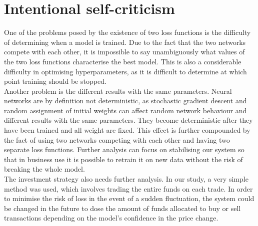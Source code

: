 \documentclass[11pt]{article} %
\begin{document}
\section{Intentional self-criticism}

One of the problems posed by the existence of two loss functions is the difficulty of determining when a model is trained. Due to the fact that the two networks compete with each other, it is impossible to say unambiguously what values of the two loss functions characterise the best model. This is also a considerable difficulty in optimising hyperparameters, as it is difficult to determine at which point training should be stopped. \\

Another problem is the different results with the same parameters. Neural networks are by definition not deterministic, as stochastic gradient descent and random assignment of initial weights can affect random network behaviour and different results with the same parameters. They become deterministic after they have been trained and all weight are fixed. This effect is further compounded by the fact of using two networks competing with each other and having two separate loss functions. Further analysis can focus on stabilising our system so that in business use it is possible to retrain it on new data without the risk of breaking the whole model. \\

The investment strategy also needs further analysis. In our study, a very simple method was used, which involves trading the entire funds on each trade. In order to minimise the risk of loss in the event of a sudden fluctuation, the system could be changed in the future to dose the amount of funds allocated to buy or sell transactions depending on the model's confidence in the price change. 
\end{document}
